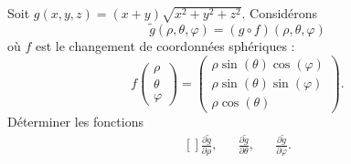 
\begin{exercice}\label{exoOutilsMath-0077}

    Soit $g(x,y,z)=(x+y)\sqrt{x^2+y^2+z^2}$. Considérons
    \begin{equation}
        \tilde g(\rho,\theta,\varphi)=(g\circ f)(\rho,\theta,\varphi)
    \end{equation}
    où $f$ est le changement de coordonnées sphériques :
    \begin{equation}
        f\begin{pmatrix}
            \rho    \\ 
            \theta    \\ 
            \varphi    
        \end{pmatrix}=\begin{pmatrix}
            \rho\sin(\theta)\cos(\varphi)    \\ 
            \rho\sin(\theta)\sin(\varphi)    \\ 
            \rho\cos(\theta)
        \end{pmatrix}.
    \end{equation}
    Déterminer les fonctions
    \begin{equation}
        \begin{aligned}[]
            \frac{ \partial \tilde g }{ \partial \rho },&&\frac{ \partial \tilde g }{ \partial \theta },&&\frac{ \partial \tilde g }{ \partial \varphi }.
        \end{aligned}
    \end{equation}

\end{exercice}
